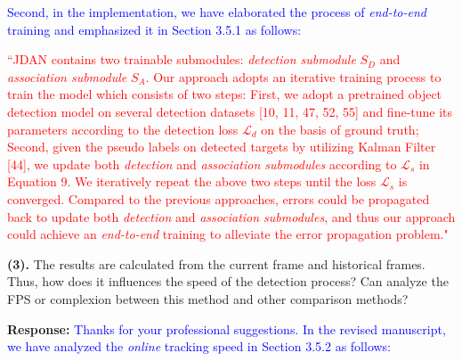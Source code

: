 \documentclass[12pt,journal,onecolumn]{IEEEtran}
\begin{document}
\textcolor{blue}{
Second, in the implementation, we have elaborated the process of \emph{end-to-end} training and emphasized it in Section 3.5.1 as follows:
}

\textcolor{red}{
``JDAN contains two trainable submodules: \emph{detection submodule} $S_D$ and \emph{association submodule} $S_A$. Our approach adopts an iterative training process to train the model which consists of two steps:
First, we adopt a pretrained object detection model on several detection datasets [10, 11, 47, 52, 55] and fine-tune its parameters according to the detection loss $\mathcal{L}_{d}$ on the basis of ground truth; 
Second, given the pseudo labels on detected targets by utilizing Kalman Filter [44], 
we update both \emph{detection} and \emph{association submodules} according to $\mathcal{L}_{s}$ in Equation 9.
We iteratively repeat the above two steps until the loss $\mathcal{L}_{s}$ is converged.
Compared to the previous approaches, errors could be propagated back to update both \emph{detection} and \emph{association submodules},
and thus our approach could achieve an \emph{end-to-end} training to alleviate the error propagation problem."
}

\vspace{8pt}

\textbf{(3).} The results are calculated from the current frame and historical frames. 
Thus, how does it influences the speed of the detection process? 
Can analyze the FPS or complexion between this method and other comparison methods?

\textbf{Response:} \textcolor{blue}{Thanks for your professional suggestions.
In the revised manuscript, we have analyzed the \emph{online} tracking speed in Section 3.5.2 as follows:
}
\end{document}
